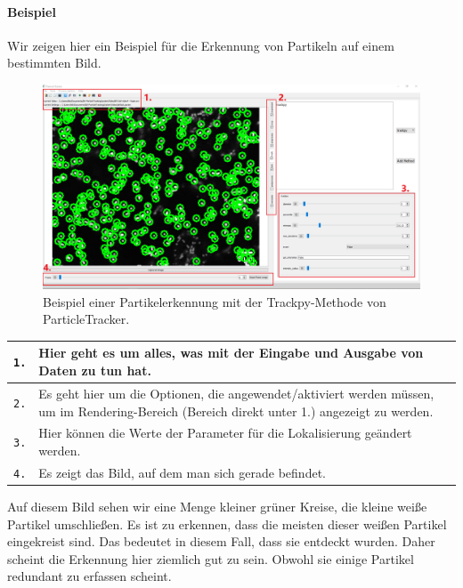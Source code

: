 	\paragraph{Beispiel\\}
	Wir zeigen hier ein Beispiel für die Erkennung von Partikeln auf einem bestimmten Bild.
	 
	\begin{figure}[H]
    \centering
    \includegraphics[scale=0.3]{Grafiken/particletracker/Using trackpy.png}
    \caption{Beispiel einer Partikelerkennung mit der Trackpy-Methode von ParticleTracker.}
    \label{fig:kap1_PT_Beispiel}
\end{figure}

\begin{tabular}{|l|p{12cm}|}
\hline
\texttt{1.} & Hier geht es um alles, was mit der Eingabe und Ausgabe von Daten zu tun hat. \\ \hline
\texttt{2.} & Es geht hier um die Optionen, die angewendet/aktiviert werden müssen, um im Rendering-Bereich (Bereich direkt unter 1.) angezeigt zu werden. \\ \hline
\texttt{3.} & Hier können die Werte der Parameter für die Lokalisierung geändert werden. \\ \hline
\texttt{4.} & Es zeigt das Bild, auf dem man sich gerade befindet. \\ \hline
\hline
\end{tabular}

Auf diesem Bild sehen wir eine Menge kleiner grüner Kreise, die kleine weiße Partikel umschließen. 
Es ist zu erkennen, dass die meisten dieser weißen Partikel eingekreist sind. Das bedeutet in diesem Fall, dass sie entdeckt wurden. Daher scheint die Erkennung hier ziemlich gut zu sein. Obwohl sie einige Partikel redundant zu erfassen scheint.


\newpage
	
